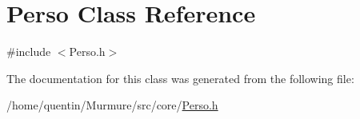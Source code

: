 \hypertarget{classPerso}{}\section{Perso Class Reference}
\label{classPerso}


{\ttfamily \#include $<$Perso.\+h$>$}



The documentation for this class was generated from the following file\+:\begin{DoxyCompactItemize}
\item 
/home/quentin/\+Murmure/src/core/\hyperlink{Perso_8h}{Perso.\+h}\end{DoxyCompactItemize}
